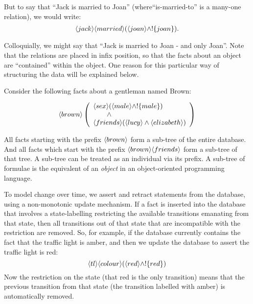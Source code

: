 \NI But to say that ``Jack is married to Joan''
(where``is-married-to'' is a many-one relation), we would write:
\begin{eqnarray*}
  \langle jack \rangle \langle married \rangle (\langle joan \rangle \land ! \{joan\}).
\end{eqnarray*}

\NI Colloquially, we might say that ``Jack is married to Joan - and
only Joan''.  Note that the relations are placed in infix position, so
that the facts about an object are ``contained'' within the object.
One reason for this particular way of structuring the data will be
explained below.
 

Consider the following facts about a gentleman named Brown:

\[
   \langle brown \rangle \left(
   \begin{array}{l}
     \langle sex \rangle (\langle male \rangle \land ! \{male\}) \\
        \qquad \land \\
     \langle friends \rangle (\langle lucy \rangle \land \langle elizabeth \rangle ) 
   \end{array}
   \right)
\]

\NI All facts  starting with the prefix $\MAY{brown}$ form a
sub-tree of the entire database.  And all  facts which start with
the prefix $\MAY{brown} \MAY{friends}$ form a sub-tree of that tree.
A sub-tree can be treated as an individual via its prefix.  
A sub-tree of formulae is the \cathoristic{} equivalent of an
\emph{object} in an object-oriented programming language.

To model change over time, we assert and retract statements from the
database, using a non-monotonic update mechanism.  If a fact is
inserted into the database that involves a state-labelling restricting
the available transitions emanating from that state, then all
transitions out of that state that are incompatible with the
restriction are removed.  So, for example, if the database currently
contains the fact that the traffic light is amber, and then we update
the database to assert the traffic light is red:
\[
\langle tl \rangle \langle colour \rangle (\langle red \rangle \land !\{red\})
\]
Now the restriction on the state (that red is the only transition)
means that the previous transition from that state (the transition
labelled with amber) is automatically removed.

